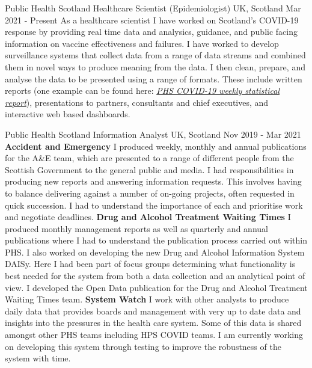 


\begin{cventries}
 \cventry
{Public Health Scotland} %
{Healthcare Scientist (Epidemiologist)} %
{UK, Scotland} %
{Mar 2021 - Present} %
{
  As a healthcare scientist I have worked on Scotland's COVID-19 response by providing real time data and analysics, guidance, and public facing information on vaccine effectiveness and failures.\newline
  I have worked to develop surveillance systems that collect data from a range of data streams and combined them in novel ways to produce meaning from the data. I then clean, prepare, and analyse the data to be presented using a range of formats. These include written reports (one example can be found here: \href{https://publichealthscotland.scot/publications/covid-19-statistical-report/}{\textit{PHS COVID-19 weekly statistical report}}), presentations to partners, consultants and chief executives, and interactive web based dashboards.
}

\cventry
{Public Health Scotland}
{Information Analyst}
{UK, Scotland}
{Nov 2019 - Mar 2021}
{
            \textbf{Accident and Emergency}\newline
        I produced weekly, monthly and annual publications for the A\&E team, which are presented to a range of different people from the Scottish Government to the general public and media. I had responsibilities in producing new reports and answering information requests. This involves having to balance delivering against a number of on-going projects, often requested in quick succession. I had to understand the importance of each and prioritise work and negotiate deadlines.\newline
        \textbf{Drug and Alcohol Treatment Waiting Times}\newline
        I produced monthly management reports as well as quarterly and annual publications where I had to understand the publication process carried out within PHS. I also worked on developing the new Drug and Alcohol Information System DAISy. Here I had been part of focus groups determining what functionality is best needed for the system from both a data collection and an analytical point of view. I developed the Open Data publication for the Drug and Alcohol Treatment Waiting Times team.\newline
        \textbf{System Watch}\newline
        I work with other analysts to produce daily data that provides boards and management with very up to date data and insights into the pressures in the health care system. Some of this data is shared amongst other PHS teams including HPS COVID teams. I am currently working on developing this system through testing to improve the robustness of the system with time.\newline
}


\end{cventries}
